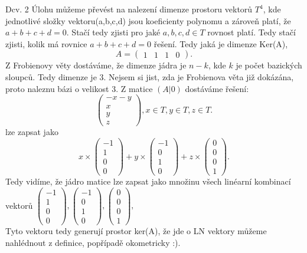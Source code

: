 \documentclass[a4paper]{article}
\begin{document}
\begin{section}{Dcv. 2}
    Úlohu můžeme převést na nalezení dimenze prostoru vektorů $T^{4}$, kde jednotlivé složky vektoru(a,b,c,d) jsou koeficienty polynomu a zároveň platí, že $a+b+c+d = 0$.
    Stačí tedy zjisti pro jaké $a,b,c,d \in T$ rovnost platí.
    Tedy stačí zjisti, kolik má rovnice $a+b+c+d = 0$ řešení. Tedy jaká je dimenze Ker(A), \[
        A = \begin{pmatrix} 1 &  1 & 1 & 0 \end{pmatrix} 
    .\] 
    Z Frobienovy věty dostáváme, že dimenze jádra je $n-k$, kde $k$ je počet bazických sloupců.
    Tedy dimenze je 3.
    Nejsem si jist, zda je Frobienova věta již dokázána, proto naleznu bázi o velikost 3.
    Z matice $(A|0)$ dostáváme řešení: \[
        \begin{pmatrix} -x - y \\ x \\ y \\ z \end{pmatrix}, x \in T, y \in T, z \in T
    .\]
    lze zapsat jako
    \[
        x \times \begin{pmatrix} -1 \\ 1 \\ 0 \\ 0 \end{pmatrix}
        + y \times \begin{pmatrix} -1 \\ 0 \\ 1 \\ 0 \end{pmatrix} 
        + z \times \begin{pmatrix} 0 \\ 0 \\ 0 \\ 1 \end{pmatrix} 
    .\] 
    Tedy vidíme, že jádro matice lze zapsat jako množinu všech linéarní kombinací vektorů
        $\begin{pmatrix} -1 \\ 1 \\ 0 \\ 0 \end{pmatrix},
        \begin{pmatrix} -1 \\ 0 \\ 1 \\ 0 \end{pmatrix},
        \begin{pmatrix} 0 \\ 0 \\ 0 \\ 1 \end{pmatrix},$
        \\
        Tyto vektoru tedy generují prostor ker(A), že jde o LN vektory můžeme nahlédnout z definice, popřípadě okometricky :).
\end{section}
\end{document}
